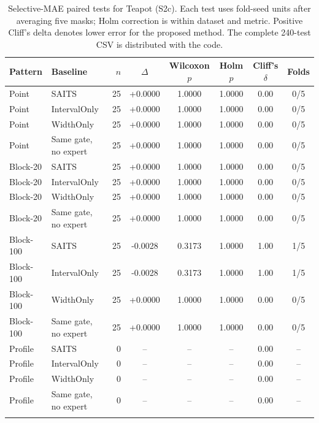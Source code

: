 \begin{table}
\caption{Selective-MAE paired tests for Teapot (S2c).
Each test uses fold-seed units after averaging five masks; Holm correction is
within dataset and metric. Positive Cliff's delta denotes lower error for the
proposed method. The complete 240-test CSV is distributed with the code.}
\label{tab:s2c}
\centering
\scriptsize
\setlength{\tabcolsep}{3.6pt}
\begin{tabular*}{\textwidth}{@{\extracolsep{\fill}}llrccccc@{}}
\toprule
Pattern & Baseline & $n$ & $\Delta$ & Wilcoxon $p$ & Holm $p$ & Cliff's $\delta$ & Folds \\
\midrule
Point & SAITS & 25 & +0.0000 & 1.0000 & 1.0000 & 0.00 & 0/5 \\
Point & IntervalOnly & 25 & +0.0000 & 1.0000 & 1.0000 & 0.00 & 0/5 \\
Point & WidthOnly & 25 & +0.0000 & 1.0000 & 1.0000 & 0.00 & 0/5 \\
Point & Same gate, no expert & 25 & +0.0000 & 1.0000 & 1.0000 & 0.00 & 0/5 \\
\addlinespace[1.5pt]
Block-20 & SAITS & 25 & +0.0000 & 1.0000 & 1.0000 & 0.00 & 0/5 \\
Block-20 & IntervalOnly & 25 & +0.0000 & 1.0000 & 1.0000 & 0.00 & 0/5 \\
Block-20 & WidthOnly & 25 & +0.0000 & 1.0000 & 1.0000 & 0.00 & 0/5 \\
Block-20 & Same gate, no expert & 25 & +0.0000 & 1.0000 & 1.0000 & 0.00 & 0/5 \\
\addlinespace[1.5pt]
Block-100 & SAITS & 25 & -0.0028 & 0.3173 & 1.0000 & 1.00 & 1/5 \\
Block-100 & IntervalOnly & 25 & -0.0028 & 0.3173 & 1.0000 & 1.00 & 1/5 \\
Block-100 & WidthOnly & 25 & +0.0000 & 1.0000 & 1.0000 & 0.00 & 0/5 \\
Block-100 & Same gate, no expert & 25 & +0.0000 & 1.0000 & 1.0000 & 0.00 & 0/5 \\
\addlinespace[1.5pt]
Profile & SAITS & 0 & -- & -- & -- & 0.00 & -- \\
Profile & IntervalOnly & 0 & -- & -- & -- & 0.00 & -- \\
Profile & WidthOnly & 0 & -- & -- & -- & 0.00 & -- \\
Profile & Same gate, no expert & 0 & -- & -- & -- & 0.00 & -- \\
\addlinespace[1.5pt]
\bottomrule
\end{tabular*}
\end{table}

